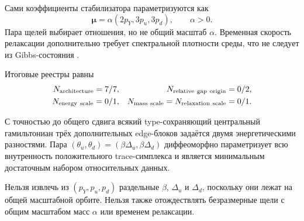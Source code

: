 Сами коэффициенты стабилизатора параметризуются как
\begin{equation}
 \boldsymbol\mu=\alpha(2p_Y,3p_u,3p_d),
 \qquad \alpha>0.
 \label{eq:v8-extra-mass-scale-parameterization}
\end{equation}
Пара щелей выбирает отношения, но не общий масштаб $\alpha$. Временная
скорость релаксации дополнительно требует спектральной плотности среды, что
не следует из Gibbs-состояния \cite{v8-extra-mass-davies}.

Итоговые реестры равны
\begin{equation}
 \begin{aligned}
 N_{\rm architecture}&=7/7,
 &N_{\rm relative\ gap\ origin}&=0/2,\\
 N_{\rm energy\ scale}&=0/1,
 &N_{\rm mass\ scale}=N_{\rm relaxation\ scale}&=0/1.
 \end{aligned}
 \label{eq:v8-extra-mass-minimal-data-ledgers}
\end{equation}

\begin{theorem}
С точностью до общего сдвига всякий type-сохраняющий центральный гамильтониан
трёх дополнительных edge-блоков задаётся двумя энергетическими разностями.
Пара $(\theta_u,\theta_d)=(\beta\Delta_u,\beta\Delta_d)$ диффеоморфно
параметризует всю внутренность положительного trace-симплекса и является
минимальным достаточным набором относительных данных.
\end{theorem}

\begin{nogocriterion}
Нельзя извлечь из $(p_Y,p_u,p_d)$ раздельные $\beta$, $\Delta_u$ и
$\Delta_d$, поскольку они лежат на общей масштабной орбите. Нельзя также
отождествлять безразмерные щели с общим масштабом масс $\alpha$ или временем
релаксации.
\end{nogocriterion}

